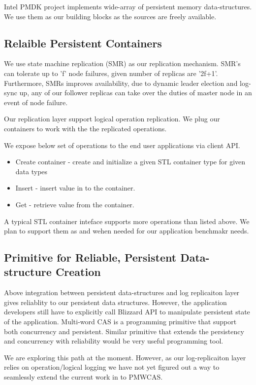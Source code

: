 Intel PMDK project implements wide-array of persistent memory data-structures. 
We use them as our building blocks as the sources are freely available. 

\subsection{Relaible Persistent Containers}

We use state machine replication (SMR) as our replication mechanism. SMR's can tolerate
up to 'f' node failures, given number of replicas are '2f+1'. Furthermore, SMRs improves
availability, due to dynamic leader election and log-sync up, any of our follower replicas
can take over the duties of master node in an event of node failure.

Our replication layer support logical operation replication. We plug our containers to work with
the the replicated operations. 

We expose below set of operations to the end user applications via client API.

\begin{itemize}
	\item Create container - create and initialize a given STL container type for given data types
	\item Insert - insert value in to the container.
	\item Get - retrieve value from the container.
\end{itemize}

A typical STL container inteface supports more operations than listed above. We plan to support them
as and wehen needed for our application benchmakr needs.

\subsection{Primitive for Reliable, Persistent Data-structure Creation}

Above integration between persistent data-structures and log replicaiton layer
gives reliablity to our persistent data structures. However, the application developers 
still have to explicitly call Blizzard API to manipulate persistent state of the application.
Multi-word CAS is a programming primitive that support both concurrency and persistent. Similar
primitive that extends the persistency and concurrency with reliability would be very useful
programming tool.

We are exploring this path at the moment. However, as our log-replicaiton layer relies on operation/logical
logging we have not yet figured out a way to seamlessly extend the current work in to PMWCAS.




